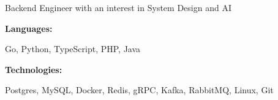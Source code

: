 \documentclass[9pt]{developercv} %
\begin{document}
\begin{minipage}[t]{0.5\textwidth}
	\vspace{-6pt}
	Backend Engineer with an interest in System Design and AI
	\vspace{-6pt}
\end{minipage}
\hfill %
\begin{minipage}[t]{0.465\textwidth}
	\vspace{-6pt}

	\begin{minipage}[t]{0.2\textwidth}
		\textbf{Languages:}
	\end{minipage}
	\hfill
	\begin{minipage}[t]{0.73\textwidth}
		Go, Python, TypeScript, PHP, Java
	\end{minipage}
	\vspace{4mm}

	\begin{minipage}[t]{0.2\textwidth}
		\textbf{Technologies:}
	\end{minipage}
	\hfill
	\begin{minipage}[t]{0.73\textwidth}
		Postgres, MySQL, Docker, Redis, gRPC, Kafka, RabbitMQ, Linux, Git
	\end{minipage}

\end{minipage}
\end{document}
